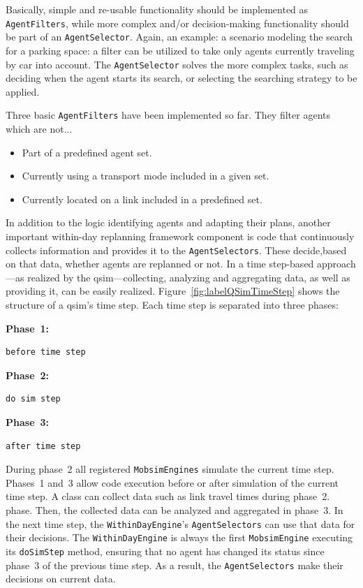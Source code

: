 Basically, simple and re-usable functionality should be implemented as \lstinline{AgentFilters}, while more complex and/or decision-making functionality should be part of an \lstinline{AgentSelector}. Again, an example: \eg a scenario modeling the search for a parking space: a filter can be utilized to take only agents currently traveling by car into account. The \lstinline{AgentSelector} solves the more complex tasks, such as deciding when the agent starts its search, or selecting the searching strategy to be applied.
%

Three basic \lstinline{AgentFilters} have been implemented so far. They filter agents which are not...
\begin{itemize}\styleItemize
    \item Part of a predefined agent set.
    \item Currently using a transport mode included in a given set.
    \item Currently located on a link included in a predefined set.
\end{itemize}
%

In addition to the logic identifying agents and adapting their plans, another important within-day replanning framework component is code that continuously collects information and provides it to the \lstinline{AgentSelectors}. These decide,based on that data, whether agents are replanned or not. In a time step-based approach---as realized by the \gls{qsim}---collecting, analyzing and aggregating data, as well as providing it, can be easily realized. Figure~\ref{fig:labelQSimTimeStep} shows the structure of a \gls{qsim}'s time step. Each time step is separated into three phases:

\textbf{Phase~1:} 
\begin{lstlisting} 
before time step 
\end{lstlisting}

\textbf{Phase~2:} 
\begin{lstlisting} 
do sim step 
\end{lstlisting}
 
\textbf{Phase~3:} 
\begin{lstlisting} 
after time step 
\end{lstlisting}
%
During phase~2
all registered \lstinline{MobsimEngines} simulate the current time step. 
Phases~1 and~3 allow code execution before or after simulation of the current time step. 
A class can collect data such as link travel times during phase~2. 
phase. Then, the collected data can be analyzed and aggregated in phase~3. 
In the next time step, the \lstinline{WithinDayEngine}'s \lstinline{AgentSelectors} can use that data for their decisions. The \lstinline{WithinDayEngine} is always the first \lstinline{MobsimEngine} executing its \lstinline{doSimStep} method, ensuring that no agent has changed its status since phase~3 
of the previous time step. As a result, the \lstinline{AgentSelectors} make their decisions on %
current data.

